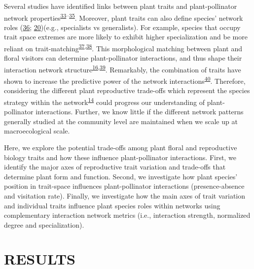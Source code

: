 \documentclass[12pt,a4paper,]{article}
\begin{document}
Several studies have identified links between plant traits and
plant-pollinator network
properties\textsuperscript{\protect\hyperlink{ref-bartomeus2013}{33}--\protect\hyperlink{ref-rowe2020}{35}}.
Moreover, plant traits can also define species' network roles
(\protect\hyperlink{ref-lazaro2013}{36};
\protect\hyperlink{ref-tur2013}{20})(e.g., specialists vs generalists).
For example, species that occupy trait space extremes are more likely to
exhibit higher specialization and be more reliant on
trait-matching\textsuperscript{\protect\hyperlink{ref-junker2013}{37},\protect\hyperlink{ref-coux2016}{38}}.
This morphological matching between plant and floral visitors can
determine plant-pollinator interactions, and thus shape their
interaction network
structure\textsuperscript{\protect\hyperlink{ref-stang2009}{16},\protect\hyperlink{ref-ibanez2012}{39}}.
Remarkably, the combination of traits have shown to increase the
predictive power of the network
interactions\textsuperscript{\protect\hyperlink{ref-eklof2013}{40}}.
Therefore, considering the different plant reproductive trade-offs which
represent the species strategy within the
network\textsuperscript{\protect\hyperlink{ref-dehling2016}{14}} could
progress our understanding of plant-pollinator interactions. Further, we
know little if the different network patterns generally studied at the
community level are maintained when we scale up at macroecological
scale.

Here, we explore the potential trade-offs among plant floral and
reproductive biology traits and how these influence plant-pollinator
interactions. First, we identify the major axes of reproductive trait
variation and trade-offs that determine plant form and function. Second,
we investigate how plant species' position in trait-space influences
plant-pollinator interactions (presence-absence and visitation rate).
Finally, we investigate how the main axes of trait variation and
individual traits influence plant species roles within networks using
complementary interaction network metrics (i.e., interaction strength,
normalized degree and specialization).

\section{RESULTS}\label{results}
\end{document}

